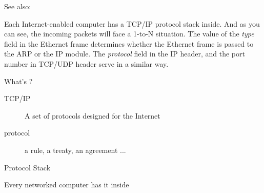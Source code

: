 See also: 

Each Internet-enabled computer has a TCP/IP protocol stack inside. And as you can see, the
incoming packets will face a 1-to-N situation. The value of the \emph{type} field in the
Ethernet frame determines whether the Ethernet frame is passed to the ARP or the IP
module. The \emph{protocol} field in the IP header, and the port number in TCP/UDP header
serve in a similar way.

\begin{frame}{What's {\tcpip{}}?}
  \begin{description}
  \item[TCP/IP] A set of protocols designed for the Internet
  \item[protocol] a rule, a treaty, an agreement ...
  \end{description}
  \begin{center}
  \end{center}
\end{frame}

\begin{frame}{{\tcpip{}} Protocol Stack}
  \begin{iblock}{Every networked computer has it inside}
    \begin{center}
    \end{center}
  \end{iblock}
\end{frame}

